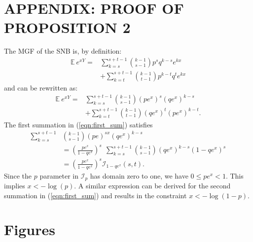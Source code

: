 \documentclass[sii]{ipart}
\begin{document}
\section*{APPENDIX: PROOF OF PROPOSITION 2}
The MGF of the SNB is, by definition:
\begin{align*}
\mathbb{E}~e^{xY} = & \sum_{k=s}^{s+t-1} {k-1 \choose s-1} p^s q^{k-s} e^{kx} \\
  & + \sum_{k=t}^{s+t-1} {k-1 \choose t-1} p^{k-t} q^t e^{kx}
\end{align*}
and can be rewritten as:
\begin{align} \label{eqn:first_sum}
\mathbb{E}~e^{xY} = & \sum_{k=s}^{s+t-1}{k-1 \choose s-1} (pe^x)^{s} (qe^x)^{k-s} \nonumber \\
  & + \sum_{k=t}^{s+t-1}{k-1 \choose t-1} (qe^x)^t (pe^x)^{k-t}.
\end{align}
The first summation in (\ref{eqn:first_sum}) satisfies
\begin{align*}
\sum_{k=s}^{s+t-1} &{k-1 \choose s-1}  (pe)^{sx} (qe^x)^{k-s}  \\
  & = \left(\frac{pe^x}{1 - qe^x}\right)^s \ \ \sum_{k=s}^{s+t-1} {k-1 \choose s-1} 
    (qe^x)^{k-s} (1-qe^x)^s \\
  & = \left(\frac{pe^x}{1 - qe^x}\right)^s \mathcal{I}_{1-qe^x}(s, t).
\end{align*}
Since the $p$ parameter in $\mathcal{I}_p$ has domain zero 
to one, we have $0 \leq pe^x < 1$. This implies $x < -\log(p)$.
A similar expression can be derived for the second summation in 
(\ref{eqn:first_sum}) and results in
the constraint $x < -\log(1-p)$.





\pagebreak

\onecolumn 

\section*{Figures}
\end{document}
